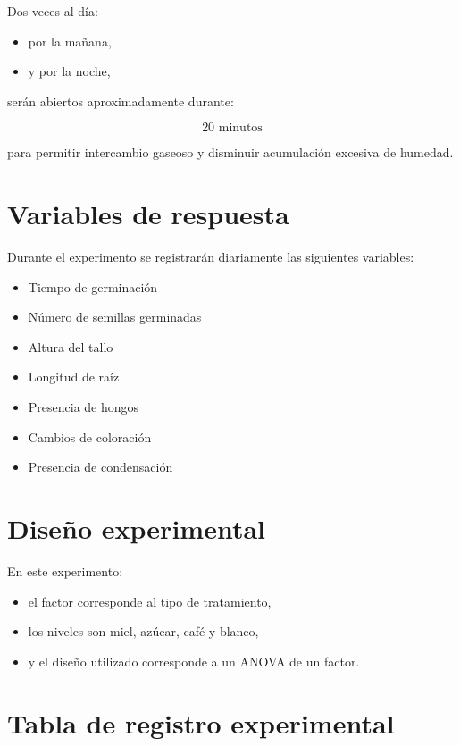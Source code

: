 Dos veces al día:

\begin{itemize}
\item por la mañana,
\item y por la noche,
\end{itemize}

serán abiertos aproximadamente durante:

\[
20 \text{ minutos}
\]

para permitir intercambio gaseoso y disminuir acumulación excesiva de humedad.

\section{Variables de respuesta}

Durante el experimento se registrarán diariamente las siguientes variables:

\begin{itemize}
\item Tiempo de germinación
\item Número de semillas germinadas
\item Altura del tallo
\item Longitud de raíz
\item Presencia de hongos
\item Cambios de coloración
\item Presencia de condensación
\end{itemize}

\section{Diseño experimental}

En este experimento:

\begin{itemize}
\item el factor corresponde al tipo de tratamiento,
\item los niveles son miel, azúcar, café y blanco,
\item y el diseño utilizado corresponde a un ANOVA de un factor.
\end{itemize}

\section{Tabla de registro experimental}

